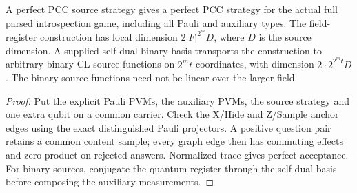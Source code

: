 \begin{lemma}
\label{lem:intro-full-typed-completeness}
\leanok
A perfect PCC source strategy gives a perfect PCC strategy for the actual
full parsed introspection game, including all Pauli and auxiliary types.
The field-register construction has local dimension $2|F|^{2^m}D$, where
$D$ is the source dimension. A supplied self-dual binary basis transports
the construction to arbitrary binary CL source functions on $2^m t$
coordinates, with dimension $2\cdot2^{2^m t}D$. The binary source functions
need not be linear over the larger field.
\end{lemma}
\begin{proof}
\leanok
Put the explicit Pauli PVMs, the auxiliary PVMs, the source strategy and
one extra qubit on a common carrier. Check the X/Hide and Z/Sample anchor
edges using the exact distinguished Pauli projectors. A positive question
pair retains a common content sample; every graph edge then has commuting
effects and zero product on rejected answers. Normalized trace gives
perfect acceptance. For binary sources, conjugate the quantum register
through the self-dual basis before composing the auxiliary measurements.
\end{proof}

